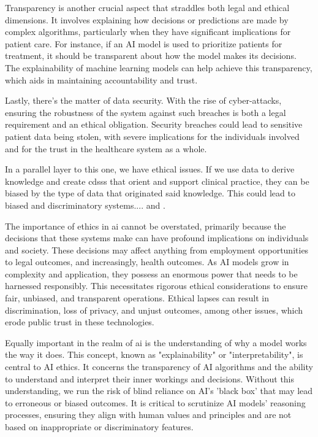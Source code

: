 Transparency is another crucial aspect that straddles both legal and ethical dimensions. It involves explaining how decisions or predictions are made by complex algorithms, particularly when they have significant implications for patient care. For instance, if an AI model is used to prioritize patients for treatment, it should be transparent about how the model makes its decisions. The explainability of machine learning models can help achieve this transparency, which aids in maintaining accountability and trust.

Lastly, there's the matter of data security. With the rise of cyber-attacks, ensuring the robustness of the system against such breaches is both a legal requirement and an ethical obligation. Security breaches could lead to sensitive patient data being stolen, with severe implications for the individuals involved and for the trust in the healthcare system as a whole.


In a parallel layer to this one, we have ethical issues. If we use data to derive knowledge and create  \acp{cdss} that orient and support clinical practice, they can be biased by the type of data that originated said knowledge.
This could lead to biased and discriminatory systems....
and \cite{EthicsGuidelinesTrustworthy2019}.

The importance of ethics in \ac{ai} cannot be overstated, primarily because the decisions that these systems make can have profound implications on individuals and society. These decisions may affect anything from employment opportunities to legal outcomes, and increasingly, health outcomes. As AI models grow in complexity and application, they possess an enormous power that needs to be harnessed responsibly. This necessitates rigorous ethical considerations to ensure fair, unbiased, and transparent operations. Ethical lapses can result in discrimination, loss of privacy, and unjust outcomes, among other issues, which erode public trust in these technologies.

Equally important in the realm of \ac{ai} is the understanding of why a model works the way it does. This concept, known as "explainability" or "interpretability", is central to AI ethics. It concerns the transparency of AI algorithms and the ability to understand and interpret their inner workings and decisions. Without this understanding, we run the risk of blind reliance on AI's 'black box' that may lead to erroneous or biased outcomes. It is critical to scrutinize AI models' reasoning processes, ensuring they align with human values and principles and are not based on inappropriate or discriminatory features.

